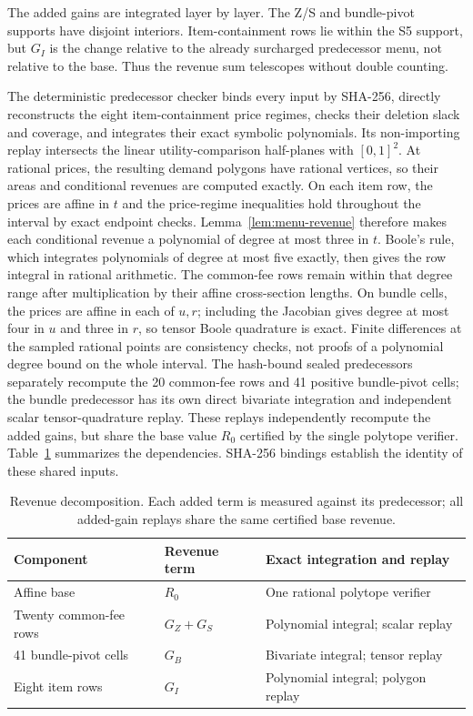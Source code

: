 \documentclass[11pt]{article}
\begin{document}
The added gains are integrated layer by layer.  The Z/S and bundle-pivot
supports have disjoint interiors.  Item-containment rows lie within the
S5 support, but \(G_I\) is the change relative to the already surcharged
predecessor menu, not relative to the base.  Thus the revenue sum telescopes
without double counting.

The deterministic predecessor checker binds every input by SHA-256, directly
reconstructs the eight
item-containment price regimes, checks their deletion slack and coverage, and
integrates their exact symbolic polynomials.  Its non-importing replay
intersects the linear utility-comparison half-planes with \([0,1]^2\).
At rational prices, the resulting demand polygons have rational vertices,
so their areas and conditional revenues are computed exactly.  On each item
row, the prices are affine in \(t\) and the
price-regime inequalities hold throughout the interval by exact endpoint
checks.  Lemma~\ref{lem:menu-revenue} therefore makes each conditional revenue
a polynomial of degree at most three in \(t\).  Boole's rule, which integrates
polynomials of degree at most five exactly, then gives the row integral in
rational arithmetic.  The common-fee rows remain within that degree range
after multiplication by their affine cross-section lengths.  On bundle cells,
the prices are affine in each of \(u,r\); including the Jacobian gives degree
at most four in \(u\) and three in \(r\), so tensor Boole quadrature is exact.
Finite differences at the sampled rational points are consistency checks,
not proofs of a polynomial degree bound on the whole interval.
The hash-bound sealed predecessors separately
recompute the 20 common-fee rows and 41 positive bundle-pivot cells; the bundle
predecessor has its own direct bivariate integration and independent scalar
tensor-quadrature replay.  These replays independently recompute the added
gains, but share the base value \(R_0\) certified by the single polytope
verifier.  Table~\ref{tab:lower-components} summarizes the dependencies.
SHA-256 bindings establish the identity of these shared inputs.

\begin{table}[ht]
\centering\small
\begin{tabular}{@{}lll@{}}
\toprule
Component & Revenue term & Exact integration and replay \\
\midrule
Affine base & \(R_0\) & One rational polytope verifier \\
Twenty common-fee rows & \(G_Z+G_S\) & Polynomial integral; scalar replay \\
41 bundle-pivot cells & \(G_B\) & Bivariate integral; tensor replay \\
Eight item rows & \(G_I\) & Polynomial integral; polygon replay \\
\bottomrule
\end{tabular}
\caption{Revenue decomposition.  Each added term is measured against its
predecessor; all added-gain replays share the same certified base revenue.}
\label{tab:lower-components}
\end{table}
\end{document}
